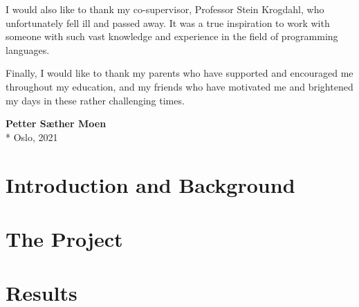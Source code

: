 \documentclass[UKenglish]{ifimaster}
\begin{document}
I would also like to thank my co-supervisor, Professor Stein Krogdahl, who unfortunately fell ill and passed away.
It was a true inspiration to work with someone with such vast knowledge and experience in the field of programming languages.

Finally, I would like to thank my parents who have supported and encouraged me throughout my education, and my friends who have motivated me and brightened my days in these rather challenging times.\\

\begin{flushright}
    \textbf{Petter Sæther Moen}\\*
    Oslo, 2021
\end{flushright}

\hypersetup{linkcolor=black}

\tableofcontents{}
\listoflistings{}



\cleardoublepage

\hypersetup{linkcolor=blue}

\mainmatter{}


\part{Introduction and Background}\label{part:introduction}





\part{The Project}\label{part:the-project}









\part{Results}\label{part:Results}






\backmatter{}
\printbibliography
\end{document}

